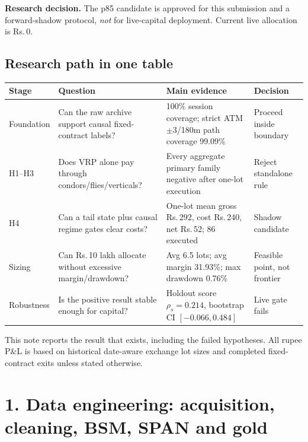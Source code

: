 \documentclass[10pt,a4paper]{article}
\newcommand{\INR}{\textsf{Rs.}\,}
\newcommand{\decisionbox}[1]{\colorbox{Pale}{\parbox{0.965\linewidth}{\textbf{Research decision.} #1}}}
\begin{document}
\decisionbox{The p85 candidate is approved for this submission and a forward-shadow protocol, \emph{not} for live-capital deployment. Current live allocation is \INR0.}

\subsection*{Research path in one table}
\begin{tabularx}{\linewidth}{@{}p{16mm}p{43mm}p{39mm}Y@{}}
\toprule
Stage & Question & Main evidence & Decision \\
\midrule
Foundation & Can the raw archive support causal fixed-contract labels? & 100\% session coverage; strict ATM$\pm3$/180m path coverage 99.09\% & Proceed inside boundary \\
H1--H3 & Does VRP alone pay through condors/flies/verticals? & Every aggregate primary family negative after one-lot execution & Reject standalone rule \\
H4 & Can a tail state plus causal regime gates clear costs? & One-lot mean gross \INR292, cost \INR240, net \INR52; 86 executed & Shadow candidate \\
Sizing & Can \INR10 lakh allocate without excessive margin/drawdown? & Avg 6.5 lots; avg margin 31.93\%; max drawdown 0.76\% & Feasible point, not frontier \\
Robustness & Is the positive result stable enough for capital? & Holdout score $\rho_s=0.214$, bootstrap CI $[-0.066,0.484]$ & Live gate fails \\
\bottomrule
\end{tabularx}

\vfill
{\scriptsize\color{Grey}This note reports the result that exists, including the failed hypotheses. All rupee P\&L is based on historical date-aware exchange lot sizes and completed fixed-contract exits unless stated otherwise.}

\newpage
\section*{1. Data engineering: acquisition, cleaning, BSM, SPAN and gold}
\end{document}
